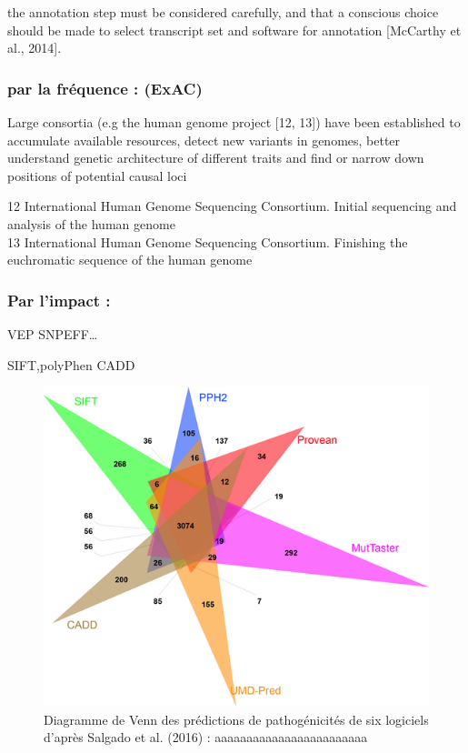 \documentclass[12pt,twoside]{reedthesis}
\theoremstyle{definition}
\theoremstyle{definition}
\theoremstyle{remark}
\begin{document}
  the annotation step must be considered carefully, and that a conscious
  choice should be made to select transcript set and software for
  annotation {[}McCarthy et al., 2014{]}.
  
  \subsubsection{par la fréquence : (ExAC)}\label{par-la-frequence-exac}
  
  Large consortia (e.g the human genome project {[}12, 13{]}) have been
  established to accumulate available resources, detect new variants in
  genomes, better understand genetic architecture of different traits and
  find or narrow down positions of potential causal loci
  
  12 International Human Genome Sequencing Consortium. Initial sequencing
  and analysis of the human genome\\
  13 International Human Genome Sequencing Consortium. Finishing the
  euchromatic sequence of the human genome
  
  \subsubsection{Par l'impact :}\label{par-limpact}
  
  VEP SNPEFF\ldots{}
  
  SIFT,polyPhen CADD
  
  \begin{figure}
  
  {\centering \includegraphics[scale=.55]{figure/venn_Diag_patho_pred} 
  
  }
  
  \caption[Diagramme de Venn des prédictions de pathogénicités de six logiciels d’après Salgado et al. (2016)]{Diagramme de Venn des prédictions de pathogénicités de six logiciels d’après Salgado et al. (2016) : aaaaaaaaaaaaaaaaaaaaaaaa}\label{fig:vennpred}
  \end{figure}
  
\end{document}

